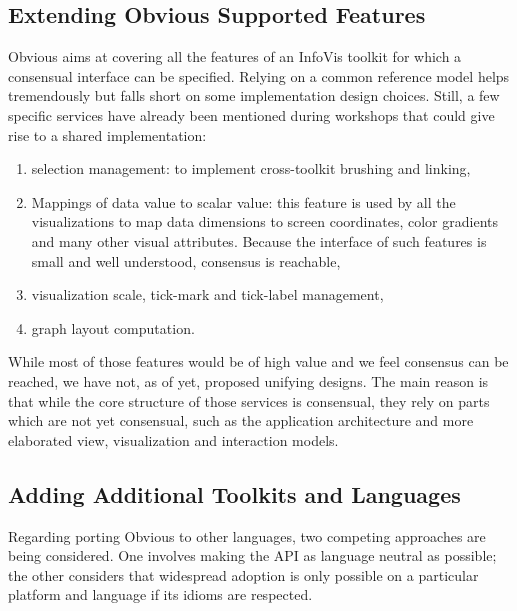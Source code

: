 
\subsection{Extending Obvious Supported Features}

Obvious aims at covering all the features of an InfoVis toolkit for
which a consensual interface can be specified.  Relying on a common
reference model helps tremendously but falls short on some
implementation design choices.  Still, a few specific services have
already been mentioned during workshops that could give rise to a
shared implementation:

\begin{enumerate}[noitemsep]
\item selection management: to implement cross-toolkit brushing and
  linking,
\item Mappings of data value to scalar value: this feature is used by
  all the visualizations to map data dimensions to screen coordinates,
  color gradients and many other visual attributes. Because the
  interface of such features is small and well understood, consensus
  is reachable,
\item visualization scale, tick-mark and tick-label management,
\item graph layout computation.
\end{enumerate}

While most of those features would be of high value and we feel
consensus can be reached, we have not, as of yet, proposed unifying
designs.  The main reason is that while the core structure of those
services is consensual, they rely on parts which are not yet
consensual, such as the application architecture and more elaborated
view, visualization and interaction models.

\subsection{Adding Additional Toolkits and Languages}

Regarding porting Obvious to other languages, two competing approaches
are being considered.  One involves making the API as language neutral
as possible; the other considers that widespread adoption is only
possible on a particular platform and language if its idioms are
respected.

